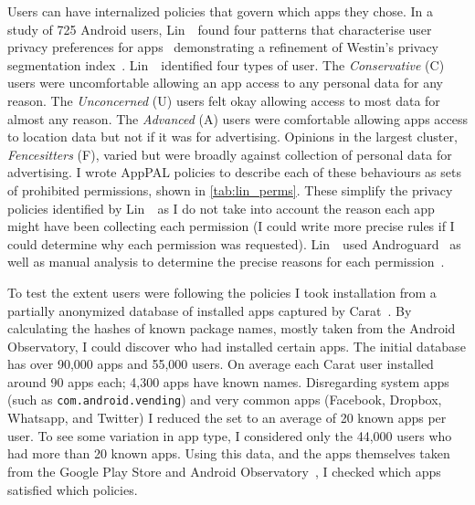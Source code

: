 \documentclass[thesis.tex]{subfiles}
\begin{document}
Users can have internalized policies that govern which apps they chose.
In a study of 725 Android users, Lin~\etal~found four patterns that characterise user privacy preferences for apps~\cite{lin_modeling_2014} demonstrating a refinement of Westin's privacy segmentation index~\cite{harris_interactive_privacy_2002}.
Lin~\etal~identified four types of user.
The \emph{Conservative} (C) users were uncomfortable allowing an app access to any personal data for any reason.
The \emph{Unconcerned} (U) users felt okay allowing access to most data for almost any reason.
The \emph{Advanced} (A) users were comfortable allowing apps access to location data but not if it was for advertising.
Opinions in the largest cluster, \emph{Fencesitters} (F), varied but were broadly against collection of personal data for advertising.
I wrote AppPAL policies to describe each of these behaviours as sets of prohibited permissions, shown in \autoref{tab:lin_perms}.
These simplify the privacy policies identified by Lin~\etal~as I do not take into account the reason each app might have been collecting each permission
(I could write more precise rules if I could determine why each permission was requested).
Lin~\etal~used Androguard~\cite{andrew_desnos_androguard_????} as well as manual analysis to determine the precise reasons for each permission~\cite{lin_modeling_2014}.

To test the extent users were following the policies I took installation from a partially anonymized database of installed apps captured by Carat~\cite{oliner_carat:_2013}.
By calculating the hashes of known package names, mostly taken from the Android Observatory, I could discover who had installed certain apps.
The initial database has over 90,000 apps and 55,000 users.
On average each Carat user installed around 90 apps each; 4,300 apps have known names.
Disregarding system apps (such as \texttt{com.android.vending}) and very common apps (Facebook, Dropbox, Whatsapp, and Twitter) I reduced the set to an average of 20 known apps per user.
To see some variation in app type, I considered only the 44,000 users who had more than 20 known apps.
Using this data, and the apps themselves taken from the Google Play Store and Android Observatory~\cite{barrera_understanding_2012}, I checked which apps satisfied which policies.
\end{document}
